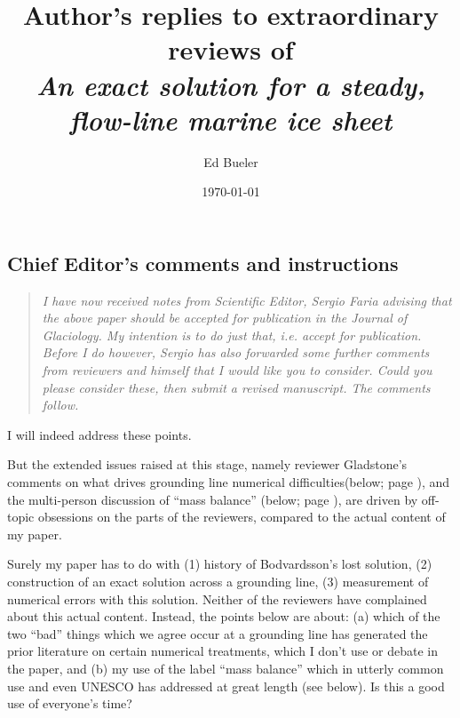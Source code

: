 \documentclass[11pt,reqno]{amsart}
\title[Author's replies to extraordinary reviews of \emph{An exact solution \dots}]{Author's replies to extraordinary reviews of \\ \emph{An exact solution for a steady, flow-line marine ice sheet}}
\author{Ed Bueler}
\date{\today}
\begin{document}
\maketitle

\thispagestyle{empty}



\subsection*{Chief Editor's comments and instructions}  \begin{quote}
\emph{I have now received notes from Scientific Editor, Sergio Faria advising that the above paper should be accepted for publication in the Journal of Glaciology.  My intention is to do just that, i.e. accept for publication.  Before I do however, Sergio has also forwarded some further comments from reviewers and himself that I would like you to consider.  Could you please consider these, then submit a revised manuscript.  The comments follow.}
\end{quote}

\medskip
\noindent I will indeed address these points.

\medskip
\noindent But the extended issues raised at this stage, namely reviewer Gladstone's comments on what drives grounding line numerical difficulties(below; page \pageref{gl}), and the multi-person discussion of ``mass balance'' (below; page \pageref{mb}), are driven by off-topic obsessions on the parts of the reviewers, compared to the actual content of my paper.

\medskip
\noindent Surely my paper has to do with (1) history of Bodvardsson's lost solution, (2) construction of an exact solution across a grounding line, (3) measurement of numerical errors with this solution.  Neither of the reviewers have complained about this actual content.  Instead, the points below are about: (a) which of the two ``bad'' things which we agree occur at a grounding line has generated the prior literature on certain numerical treatments, which I don't use or debate in the paper, and (b) my use of the label ``mass balance'' which in utterly common use and even UNESCO has addressed at great length (see below).  Is this a good use of everyone's time?
\end{document}
